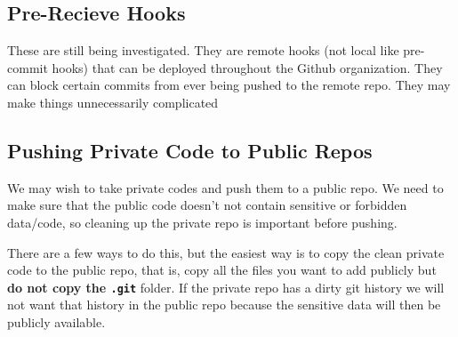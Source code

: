 \documentclass[
  letterpaper,
  DIV=11,
  numbers=noendperiod,
  oneside]{scrartcl}
\begin{document}
\newpage{}

\subsection{Pre-Recieve Hooks}\label{pre-recieve-hooks}

These are still being investigated. They are remote hooks (not local
like pre-commit hooks) that can be deployed throughout the Github
organization. They can block certain commits from ever being pushed to
the remote repo. They may make things unnecessarily complicated

\subsection{Pushing Private Code to Public
Repos}\label{pushing-private-code-to-public-repos}

We may wish to take private codes and push them to a public repo. We
need to make sure that the public code doesn't not contain sensitive or
forbidden data/code, so cleaning up the private repo is important before
pushing.

There are a few ways to do this, but the easiest way is to copy the
clean private code to the public repo, that is, copy all the files you
want to add publicly but \textbf{do not copy the \texttt{.git}} folder.
If the private repo has a dirty git history we will not want that
history in the public repo because the sensitive data will then be
publicly available.
\end{document}
